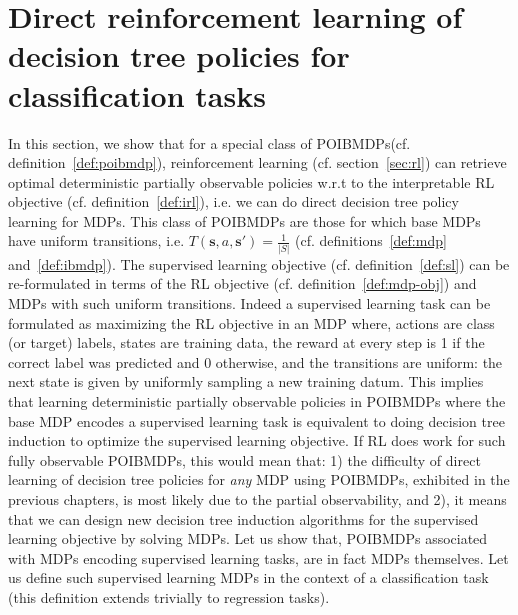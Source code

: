 \chapter{Direct reinforcement learning of decision tree policies for classification tasks}\label{sec:pomdp-classif}
In this section, we show that for a special class of POIBMDPs(cf. definition~\ref{def:poibmdp}), reinforcement learning (cf. section~\ref{sec:rl}) can retrieve optimal deterministic partially observable policies w.r.t to the interpretable RL objective (cf. definition~\ref{def:irl}), i.e. we can do direct decision tree policy learning for MDPs.
This class of POIBMDPs are those for which base MDPs have uniform transitions, i.e. $T(\boldsymbol{s}, a, \boldsymbol{s}') = \frac{1}{|S|}$ (cf. definitions~\ref{def:mdp} and~\ref{def:ibmdp}).
The supervised learning objective (cf. definition~\ref{def:sl}) can be re-formulated in terms of the RL objective (cf. definition~\ref{def:mdp-obj}) and MDPs with such uniform transitions.
Indeed a supervised learning task can be formulated as maximizing the RL objective in an MDP where, actions are class (or target) labels, states are training data, the reward at every step is 1 if the correct label was predicted and 0 otherwise, and the transitions are uniform: the next state is given by uniformly sampling a new training datum. 
This implies that learning deterministic partially observable policies in POIBMDPs where the base MDP encodes a supervised learning task is equivalent to doing decision tree induction to optimize the supervised learning objective.
If RL does work for such fully observable POIBMDPs, this would mean that: 1) the difficulty of direct learning of decision tree policies for \textit{any} MDP using POIBMDPs, exhibited in the previous chapters, is most likely due to the partial observability, and 2), it means that we can design new decision tree induction algorithms for the supervised learning objective by solving MDPs.
Let us show that, POIBMDPs associated with MDPs encoding supervised learning tasks, are in fact MDPs themselves.
Let us define such supervised learning MDPs in the context of a classification task (this definition extends trivially to regression tasks).
